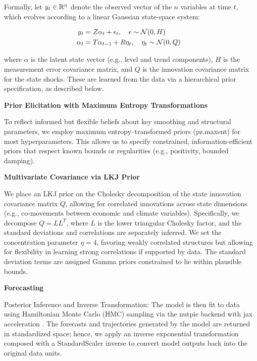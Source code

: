 Formally, let $y_t \in \mathbb{R}^n$ denote the observed vector of the $n$ variables at time $t$, which evolves according to a linear Gaussian state-space system:

\begin{align}
y_t &= Z\alpha_t + \epsilon_t, \quad \epsilon \sim \mathcal{N}(0, H) \\
\alpha_t &= T\alpha_{t-1} + R\eta_t, \quad \eta_t \sim \mathcal{N}(0, Q)
\end{align}

where $\alpha$ is the latent state vector (e.g., level and trend components), $H$ is the measurement error covariance matrix, and $Q$ is the innovation covariance matrix for the state shocks. These are learned from the data via a hierarchical prior specification, as described below.

\textbf{Prior Elicitation with Maximum Entropy Transformations}

To reflect informed but flexible beliefs about key smoothing and structural parameters, we employ maximum entropy--transformed priors (pz.maxent) for most hyperparameters. This allows us to specify constrained, information-efficient priors that respect known bounds or regularities (e.g., positivity, bounded damping).

\textbf{Multivariate Covariance via LKJ Prior}

We place an LKJ prior on the Cholesky decomposition of the state innovation covariance matrix $Q$, allowing for correlated innovations across state dimensions (e.g., co-movements between economic and climate variables). Specifically, we decompose $Q = LL^T$, where $L$ is the lower triangular Cholesky factor, and the standard deviations and correlations are separately inferred. We set the concentration parameter $\eta=4$, favoring weakly correlated structures but allowing for flexibility in learning strong correlations if supported by data. The standard deviation terms are assigned Gamma priors constrained to lie within plausible bounds.

\textbf{Forecasting}

Posterior Inference and Inverse Transformation: The model is then fit to data using Hamiltonian Monte Carlo (HMC) sampling via the nutpie backend \citep{nutpie2023} with jax acceleration \citep{jax2018}. The forecasts and trajectories generated by the model are returned in standardized space; hence, we apply an inverse exponential transformation composed with a StandardScaler inverse to convert model outputs back into the original data units.

